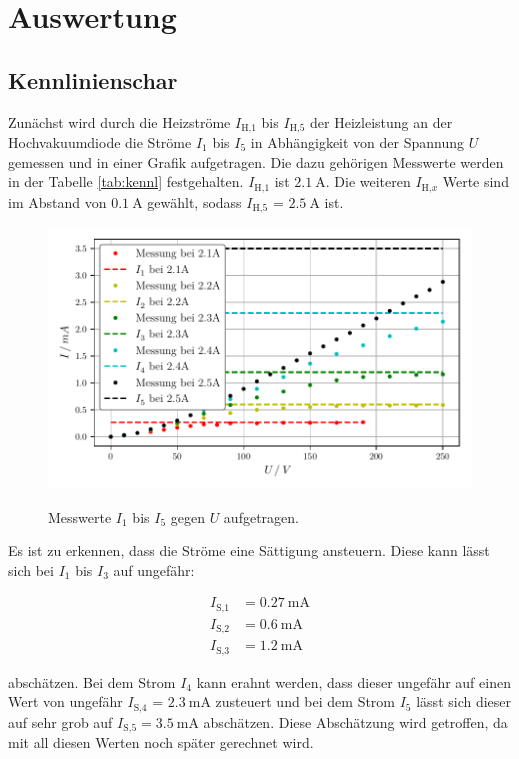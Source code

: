 \newpage
\section{Auswertung}
\subsection{Kennlinienschar}
Zunächst wird durch die Heizströme $I_{\text{H,}1}$ bis $I_{\text{H,}5}$ der Heizleistung an der Hochvakuumdiode die Ströme $I_1$ bis $I_5$ in Abhängigkeit von der Spannung $U$ gemessen und 
in einer Grafik aufgetragen. Die dazu gehörigen Messwerte werden in der Tabelle \ref{tab:kennl} festgehalten. $I_{\text{H,}1}$ ist $\SI{2.1}{\ampere}$. Die weiteren $I_{\text{H,}x}$ Werte sind im Abstand von 
$\SI{0.1}{\ampere}$ gewählt, sodass $I_{\text{H,}5}$ = $\SI{2.5}{\ampere}$ ist.

\begin{figure}
    \centering
    \includegraphics[width=\textwidth]{Daten/kennlinie.pdf}
    \label{fig:kennlinie}
    \caption{Messwerte $I_1$ bis $I_5$ gegen $U$ aufgetragen.}
\end{figure}

Es ist zu erkennen, dass die Ströme eine Sättigung ansteuern. Diese kann lässt sich bei $I_{1}$ bis $I_{3}$ auf ungefähr:

\begin{align*}
    I_\text{S,1} &= \SI{0.27 }{\milli\ampere} \\
    I_\text{S,2} &= \SI{0.6}{\milli\ampere} \\
    I_\text{S,3} &= \SI{1.2}{\milli\ampere}
  \end{align*}

  abschätzen. Bei dem Strom $I_{4}$ kann erahnt werden, dass dieser ungefähr auf einen Wert von ungefähr $I_\text{S,4}$ = $\SI{2.3}{\milli\ampere}$ zusteuert 
  und bei dem Strom $I_{5}$ lässt sich dieser auf sehr grob auf $I_\text{S,5} = \SI{3.5}{\milli\ampere}$ abschätzen. Diese Abschätzung wird getroffen, da mit all diesen Werten noch später gerechnet wird.

